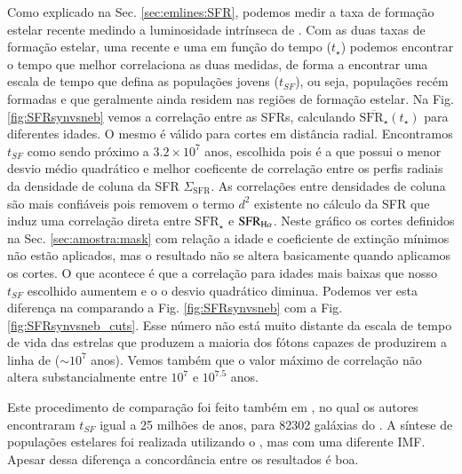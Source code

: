 Como explicado na Sec. \ref{sec:emlines:SFR}, podemos medir a taxa de formação estelar recente
medindo a luminosidade intrínseca de \Halpha. Com as duas taxas de formação estelar, uma recente e
uma em função do tempo ($t_\star$) podemos encontrar o tempo que melhor correlaciona as duas
medidas, de forma a encontrar uma escala de tempo que defina as populações jovens ($t_{SF}$), ou
seja, populações recém formadas e que geralmente ainda residem nas regiões de formação estelar. Na
Fig. \ref{fig:SFRsynvsneb} vemos a correlação entre as SFRs, calculando
$\overline{\mathrm{SFR}_\star}(t_\star)$ para diferentes idades. O mesmo é válido para cortes em
distância radial. Encontramos $t_{SF}$ como sendo próximo a $3.2 \times 10^7$ anos, escolhida pois é
a que possui o menor desvio médio quadrático e melhor coeficente de correlação entre os perfis
radiais da densidade de coluna da SFR $\Sigma_{\mathrm{SFR}}$. As correlações entre densidades de
coluna são mais confiáveis pois removem o termo $d^2$ existente no cálculo da SFR que induz uma
correlação direta entre $\mathrm{SFR}_\star$ e $\mathrm{SFR}_{\Halpha}$. Neste gráfico os cortes
definidos na Sec. \ref{sec:amostra:mask} com relação a idade e coeficiente de extinção mínimos não
estão aplicados, mas o resultado não se altera basicamente quando aplicamos os cortes. O que
acontece é que a correlação para idades mais baixas que nosso $t_{SF}$ escolhido aumentem e o o
desvio quadrático diminua. Podemos ver esta diferença na comparando a Fig. \ref{fig:SFRsynvsneb} com
a Fig. \ref{fig:SFRsynvsneb_cuts}. Esse número não está muito distante da escala de tempo de vida
das estrelas que produzem a maioria dos fótons capazes de produzirem a linha de \Halpha ($\sim10^7$
anos). Vemos também que o valor máximo de correlação não altera substancialmente entre $10^7$ e
$10^{7.5}$ anos.

Este procedimento de comparação foi feito também em \citet{Asari.etal.2007a}, no qual os autores
encontraram $t_{SF}$ igual a 25 milhões de anos, para 82302 galáxias do \SDSS. A síntese de
populações estelares foi realizada utilizando o \starlight, mas com uma diferente IMF. Apesar dessa
diferença a concordância entre os resultados é boa.

